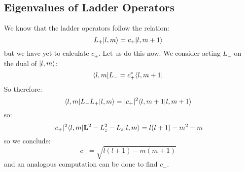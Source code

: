 \subsection{Eigenvalues of Ladder Operators}
We know that the ladder operators follow the relation:
\begin{equation}
    L_+\lvert l, m \rangle = c_+\lvert l, m+1 \rangle
\end{equation}
but we have yet to calculate $c_+$. Let us do this now. We consider acting $L_-$ on the dual of $\lvert l, m \rangle$:
\begin{equation}
    \langle l, m \rvert L_- = c_+^*\langle l, m+1 \rvert
\end{equation}
So therefore:
\begin{equation}
    \langle l, m \rvert L_-L_+\lvert l, m \rangle = \lvert c_+ \rvert^2\langle l, m+1 \lvert l, m+1 \rangle
\end{equation}
so:
\begin{equation}
    \lvert c_+ \rvert^2\langle l, m \rvert\mathbf{L}^2 - L_z^2 - L_z\lvert l, m \rangle = l(l+1) - m^2 - m
\end{equation}
so we conclude:
\begin{equation}
    c_+ = \sqrt{l(l+1) - m(m+1)}
\end{equation}
and an analogous computation can be done to find $c_-$.

